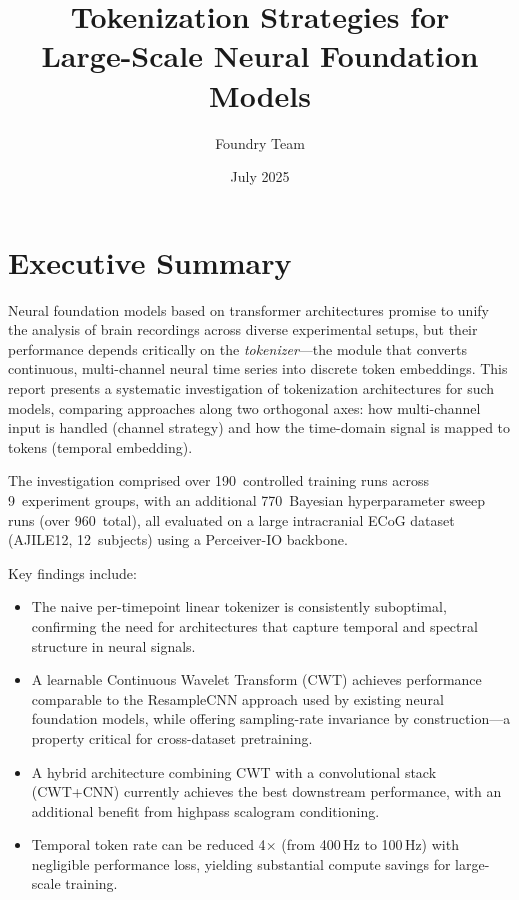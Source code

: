 \documentclass[11pt, a4paper]{article}
\title{Tokenization Strategies for\\[0.3em]
Large-Scale Neural Foundation Models}
\author{Foundry Team}
\date{July 2025}
\begin{document}
\maketitle

\section{Executive Summary}

Neural foundation models based on transformer architectures promise to unify the analysis of brain recordings across diverse experimental setups, but their performance depends critically on the \emph{tokenizer}---the module that converts continuous, multi-channel neural time series into discrete token embeddings.  This report presents a systematic investigation of tokenization architectures for such models, comparing approaches along two orthogonal axes: how multi-channel input is handled (channel strategy) and how the time-domain signal is mapped to tokens (temporal embedding).

The investigation comprised over 190~controlled training runs across 9~experiment groups, with an additional 770~Bayesian hyperparameter sweep runs (over 960~total), all evaluated on a large intracranial ECoG dataset (AJILE12, 12~subjects) using a Perceiver-IO backbone.

Key findings include:
\begin{itemize}[nosep]
    \item The naive per-timepoint linear tokenizer is consistently suboptimal, confirming the need for architectures that capture temporal and spectral structure in neural signals.
    \item A learnable Continuous Wavelet Transform (CWT) achieves performance comparable to the ResampleCNN approach used by existing neural foundation models, while offering sampling-rate invariance by construction---a property critical for cross-dataset pretraining.
    \item A hybrid architecture combining CWT with a convolutional stack (CWT+CNN) currently achieves the best downstream performance, with an additional benefit from highpass scalogram conditioning.
    \item Temporal token rate can be reduced 4$\times$ (from 400\,Hz to 100\,Hz) with negligible performance loss, yielding substantial compute savings for large-scale training.
\end{itemize}
\end{document}

